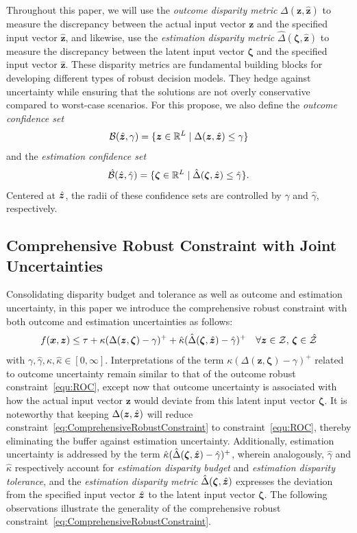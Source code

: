 \documentclass[opre, nonblindrev]{informswp}
\newcommand{\1}[1]{\mathds{1}{\left(#1\right)}}
\begin{document}
Throughout this paper, we will use the \textit{outcome disparity metric} $\Delta(\bm z, \hat{\bm z})$ to measure the discrepancy between the actual input vector $\bm z$ and the specified input vector $\hat{\bm z}$, and likewise, use the \textit{estimation disparity metric} $\hat \Delta(\bm \zeta, \hat{\bm z})$ to measure the discrepancy between the latent input vector $\bm \zeta$ and the specified input vector $\hat{\bm z}$. These disparity metrics are fundamental building blocks for developing different types of robust decision models. They hedge against uncertainty while ensuring that the solutions are not overly conservative compared to worst-case scenarios. For this propose, we also define the {\em outcome confidence set}
$$
\mathcal{B}(\hat{\bm{z}}, \gamma) = \{ \bm z \in \mathbb{R}^L \;|\; \Delta(\bm z,\hat{\bm{z}}) \leq \gamma \}
$$
and the {\em estimation confidence set}
$$
\hat {\mathcal{B}}(\hat{\bm{z}}, 
\hat \gamma) = \{ \bm \zeta \in \mathbb{R}^L \;|\; \hat \Delta(\bm \zeta,\hat{\bm{z}}) \leq \hat \gamma \}. 
$$
Centered at $\hat{\bm{z}}$, the radii of these confidence sets are controlled by $\gamma$ and $\hat \gamma$, respectively.

\subsection*{Comprehensive Robust Constraint with Joint Uncertainties}

Consolidating disparity budget and tolerance as well as outcome and estimation uncertainty, in this paper we introduce the comprehensive robust constraint with both outcome and estimation uncertainties as follows:
\begin{equation}
\label{eq:ComprehensiveRobustConstraint}
f(\bm x,\bm z) \leq \tau + \kappa (\Delta(\bm z,\bm \zeta) - \gamma)^+ + \hat \kappa (\hat \Delta(\bm \zeta,\hat{\bm{z}}) - \hat \gamma)^+ ~~~\forall \bm z \in \mathcal{Z} , \, \bm \zeta \in \hat {\mathcal{Z}}
\end{equation}
with $\gamma, \hat \gamma, \kappa, \hat \kappa \in [0, \infty]$. Interpretations of the term $\kappa (\Delta(\bm z,\bm \zeta) - \gamma)^+$ related to outcome uncertainty remain similar to that of the outcome robust constraint~\eqref{equ:ROC}, except now that outcome uncertainty is associated with how the actual input vector $\bm z$ would deviate from this latent input vector $\bm{\zeta}$. 
It is noteworthy that keeping $\Delta(\bm z,\hat{\bm{z}})$ will reduce constraint~\eqref{eq:ComprehensiveRobustConstraint} to constraint~\eqref{equ:ROC}, thereby eliminating the buffer against estimation uncertainty.
Additionally, estimation uncertainty is addressed by the term 
$\hat \kappa (\hat \Delta(\bm \zeta,\hat{\bm{z}}) - \hat \gamma)^+$, wherein analogously, $\hat \gamma$ and $\hat \kappa$ respectively account for \textit{estimation disparity budget} and \textit{estimation disparity  tolerance}, and the \textit{estimation disparity metric} $\hat \Delta(\bm \zeta,\hat{\bm{z}})$ expresses the deviation from the specified input vector $\hat{\bm{z}}$ to the latent input vector $\bm \zeta$. The following observations illustrate the generality of the comprehensive robust constraint~\eqref{eq:ComprehensiveRobustConstraint}.
\end{document}
